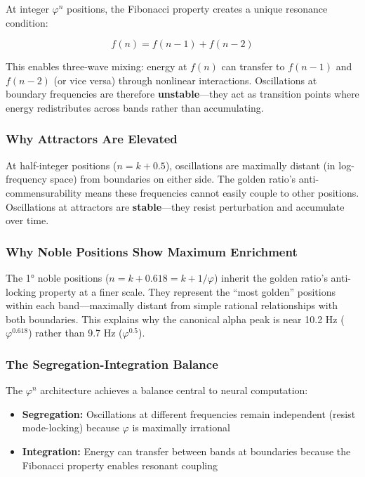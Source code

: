 \documentclass[11pt,a4paper]{article}
\newcommand{\phisym}{\varphi}
\begin{document}
At integer $\phisym^n$ positions, the Fibonacci property creates a unique resonance condition:

\begin{equation}
f(n) = f(n-1) + f(n-2)
\end{equation}

This enables three-wave mixing: energy at $f(n)$ can transfer to $f(n-1)$ and $f(n-2)$ (or vice versa) through nonlinear interactions. Oscillations at boundary frequencies are therefore \textbf{unstable}---they act as transition points where energy redistributes across bands rather than accumulating.

\subsubsection{Why Attractors Are Elevated}

At half-integer positions ($n = k + 0.5$), oscillations are maximally distant (in log-frequency space) from boundaries on either side. The golden ratio's anti-commensurability means these frequencies cannot easily couple to other positions. Oscillations at attractors are \textbf{stable}---they resist perturbation and accumulate over time.

\subsubsection{Why Noble Positions Show Maximum Enrichment}

The 1° noble positions ($n = k + 0.618 = k + 1/\phisym$) inherit the golden ratio's anti-locking property at a finer scale. They represent the ``most golden'' positions within each band---maximally distant from simple rational relationships with both boundaries. This explains why the canonical alpha peak is near 10.2 Hz ($\phisym^{0.618}$) rather than 9.7 Hz ($\phisym^{0.5}$).

\subsubsection{The Segregation-Integration Balance}

The $\phisym^n$ architecture achieves a balance central to neural computation:

\begin{itemize}
    \item \textbf{Segregation:} Oscillations at different frequencies remain independent (resist mode-locking) because $\phisym$ is maximally irrational
    
    \item \textbf{Integration:} Energy can transfer between bands at boundaries because the Fibonacci property enables resonant coupling
\end{itemize}
\end{document}
